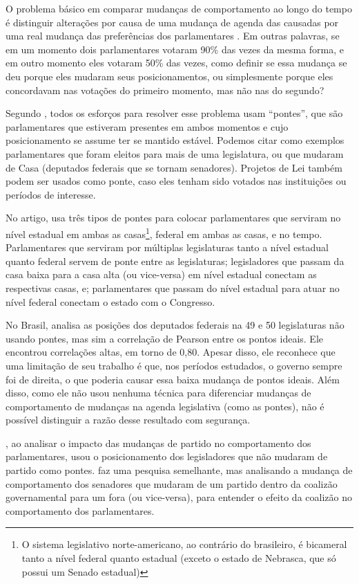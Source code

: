 O problema básico em comparar mudanças de comportamento ao longo do tempo é
distinguir alterações por causa de uma mudança de agenda das causadas por uma
real mudança das preferências dos parlamentares \cite{Bailey2007}. Em outras
palavras, se em um momento dois parlamentares votaram 90\% das vezes da mesma
forma, e em outro momento eles votaram 50\% das vezes, como definir se essa
mudança se deu porque eles mudaram seus posicionamentos, ou simplesmente porque
eles concordavam nas votações do primeiro momento, mas não nas do segundo?

Segundo , todos os esforços para resolver esse problema
usam ``pontes'', que são parlamentares que estiveram presentes em ambos
momentos e cujo posicionamento se assume ter se mantido estável. Podemos citar
como exemplos parlamentares que foram eleitos para mais de uma legislatura, ou
que mudaram de Casa (deputados federais que se tornam senadores). Projetos de
Lei também podem ser usados como ponte, caso eles tenham sido votados nas
instituições ou períodos de interesse.

No artigo,  usa três tipos de pontes para colocar
parlamentares que serviram no nível estadual em ambas as casas\footnote{O
sistema legislativo norte-americano, ao contrário do brasileiro, é bicameral
tanto a nível federal quanto estadual (exceto o estado de Nebrasca, que só
possui um Senado estadual)}, federal em ambas as casas, e no tempo.
Parlamentares que serviram por múltiplas legislaturas tanto a nível estadual
quanto federal servem de ponte entre as legislaturas; legisladores que passam
da casa baixa para a casa alta (ou vice-versa) em nível estadual conectam as
respectivas casas, e; parlamentares que passam do nível estadual para atuar no
nível federal conectam o estado com o Congresso.

No Brasil,  analisa as posições dos deputados federais na
49\textordfeminine{} e 50\textordfeminine{} legislaturas não usando pontes, mas
sim a correlação de Pearson entre os pontos ideais. Ele encontrou correlações
altas, em torno de 0,80. Apesar disso, ele reconhece que uma limitação de seu
trabalho é que, nos períodos estudados, o governo sempre foi de direita, o que
poderia causar essa baixa mudança de pontos ideais. Além disso, como ele não
usou nenhuma técnica para diferenciar mudanças de comportamento de mudanças na
agenda legislativa (como as pontes), não é possível distinguir a razão desse
resultado com segurança.

, ao analisar o impacto das mudanças de partido no
comportamento dos parlamentares, usou o posicionamento dos legisladores que não
mudaram de partido como pontes.  faz uma pesquisa
semelhante, mas analisando a mudança de comportamento dos senadores que mudaram
de um partido dentro da coalizão governamental para um fora (ou vice-versa),
para entender o efeito da coalizão no comportamento dos parlamentares.

